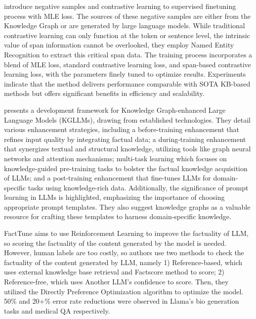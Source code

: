 \citet{sun2023contrastive} introduce negative samples and contrastive learning to supervised finetuning process with MLE loss. The sources of these negative samples are either from the Knowledge Graph or are generated by large language models. While traditional contrastive learning can only function at the token or sentence level, the intrinsic value of span information cannot be overlooked, they employ Named Entity Recognition to extract this critical span data. The training process incorporates a blend of MLE loss, standard contrastive learning loss, and span-based contrastive learning loss, with the parameters finely tuned to optimize results. Experiments indicate that the method delivers performance comparable with SOTA KB-based methods but offers significant benefits in efficiency and scalability.

\citet{yang2023chatgpt} presents a development framework for Knowledge Graph-enhanced Large Language Models (KGLLMs), drawing from established technologies. They detail various enhancement strategies, including a before-training enhancement that refines input quality by integrating factual data; a during-training enhancement that synergizes textual and structural knowledge, utilizing tools like graph neural networks and attention mechanisms; multi-task learning which focuses on knowledge-guided pre-training tasks to bolster the factual knowledge acquisition of LLMs; and a post-training enhancement that fine-tunes LLMs for domain-specific tasks using knowledge-rich data. Additionally, the significance of prompt learning in LLMs is highlighted, emphasizing the importance of choosing appropriate prompt templates. They also suggest knowledge graphs as a valuable resource for crafting these templates to harness domain-specific knowledge.

FactTune \citep{ovadia2023finetuning} aims to use Reinforcement Learning to improve the factuality of LLM, so scoring the factuality of the content generated by the model is needed. However, human labels are too costly, so authors use two methods to check the factuality of the content generated by LLM, namely 1) Reference-based, which uses external knowledge base retrieval and Factscore \citep{Min2023-FActScore} method to score; 2) Reference-free, which uses Another LLM's confidence to score. Then, they utilized the Directly Preference Optimization \citep{rafailov2023direct} algorithm to optimize the model. 50\% and 20+\% error rate reductions were observed in Llama's bio generation tasks and medical QA respectively.

